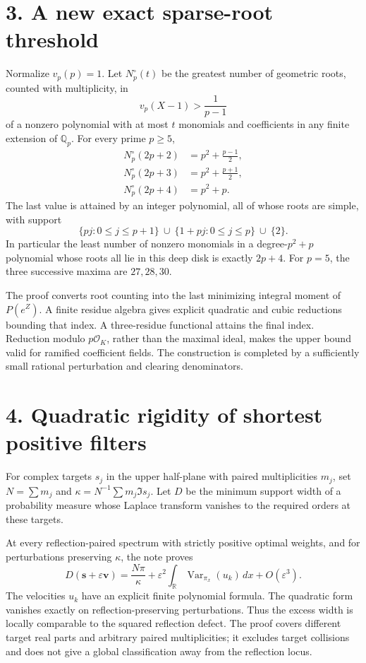 \documentclass[11pt,a4paper]{article}
\begin{document}
\clearpage
\section*{3. A new exact sparse-root threshold}
Normalize $v_p(p)=1$. Let $N_p^\circ(t)$ be the greatest number of geometric roots, counted with multiplicity, in
\[
 v_p(X-1)>\frac1{p-1}
\]
of a nonzero polynomial with at most $t$ monomials and coefficients in any finite extension of $\mathbb Q_p$. For every prime $p\ge5$,
\[
\begin{aligned}
N_p^\circ(2p+2)&=p^2+\frac{p-1}{2},\\
N_p^\circ(2p+3)&=p^2+\frac{p+1}{2},\\
N_p^\circ(2p+4)&=p^2+p.
\end{aligned}
\]
The last value is attained by an integer polynomial, all of whose roots are simple, with support
\[
 \{pj:0\le j\le p+1\}\ \cup\ \{1+pj:0\le j\le p\}\ \cup\ \{2\}.
\]
In particular the least number of nonzero monomials in a degree-$p^2+p$ polynomial whose roots all lie in this deep disk is exactly $2p+4$. For $p=5$, the three successive maxima are $27,28,30$.

The proof converts root counting into the last minimizing integral moment of $P(e^Z)$. A finite residue algebra gives explicit quadratic and cubic reductions bounding that index. A three-residue functional attains the final index. Reduction modulo $p\mathcal O_K$, rather than the maximal ideal, makes the upper bound valid for ramified coefficient fields. The construction is completed by a sufficiently small rational perturbation and clearing denominators.

\section*{4. Quadratic rigidity of shortest positive filters}
For complex targets $s_j$ in the upper half-plane with paired multiplicities $m_j$, set $N=\sum m_j$ and $\kappa=N^{-1}\sum m_j\Im s_j$. Let $D$ be the minimum support width of a probability measure whose Laplace transform vanishes to the required orders at these targets.

At every reflection-paired spectrum with strictly positive optimal weights, and for perturbations preserving $\kappa$, the note proves
\[
 D(\boldsymbol s+\varepsilon\boldsymbol v)
 =\frac{N\pi}{\kappa}
 +\varepsilon^2\int_{\mathbb R}\operatorname{Var}_{\pi_x}(u_k)\,dx
 +O(\varepsilon^3).
\]
The velocities $u_k$ have an explicit finite polynomial formula. The quadratic form vanishes exactly on reflection-preserving perturbations. Thus the excess width is locally comparable to the squared reflection defect. The proof covers different target real parts and arbitrary paired multiplicities; it excludes target collisions and does not give a global classification away from the reflection locus.
\end{document}
